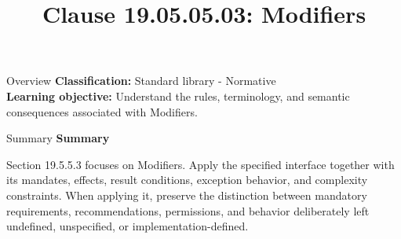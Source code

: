 \documentclass[10pt,letterpaper]{article}
\title{Clause 19.05.05.03: Modifiers}
\author{}
\date{}
\begin{document}
\maketitle
\begin{CornellOverviewBox}{Overview}
\textbf{Classification:} Standard library - Normative\\[2pt]
\textbf{Learning objective:} Understand the rules, terminology, and semantic consequences associated with Modifiers.
\end{CornellOverviewBox}\begin{CornellSummaryBox}{Summary}
{\sffamily\bfseries\color{Accent} Summary}\par\vspace{3pt}Section 19.5.5.3 focuses on Modifiers. Apply the specified interface together with its mandates, effects, result conditions, exception behavior, and complexity constraints. When applying it, preserve the distinction between mandatory requirements, recommendations, permissions, and behavior deliberately left undefined, unspecified, or implementation-defined.
\end{CornellSummaryBox}
\end{document}
